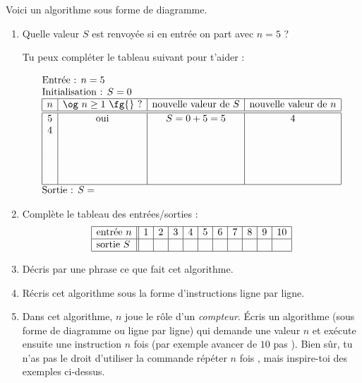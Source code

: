 \documentclass[class=report,crop=false, 12pt]{standalone}
\begin{document}
\begin{activite}
Voici un algorithme sous forme de diagramme.
  

  
\begin{enumerate}
    \item Quelle valeur $S$ est renvoyée si en entrée on part avec $n = 5$ ?
      
    Tu peux compléter le tableau suivant pour t'aider :
     
  $$
  \begin{array}{l}
  \text{Entrée : $n=5$}    \\
  \text{Initialisation : $S=0$}    \\  
  \begin{array}{|c|c|c|c|}
  \hline  
   n & \text{\og $n \ge 1$ \fg{} ?} & \text{nouvelle valeur de } S &  \text{nouvelle valeur de } n\\
  \hline\hline 
   5 & \text{oui} & S = 0+5 = 5 & 4 \\
   4 &  &  & \\
     &  &  & \\   
     &  &  & \\
     &  &  & \\      
     &  &  & \\
  \hline
  \end{array} \\
  \text{Sortie : $S = $}  
  \end{array} 
  $$ 
    
    \item Complète le tableau des entrées/sorties  : 
        $$\begin{array}{|l||c|c|c|c|c|c|c|c|c|c|}
  \hline
  \text{entrée } n & 1&2&3&4&5&6&7&8&9&10 \\
  \hline
  \text{sortie } S & &&&&&&&&& \\
  \hline
  \end{array}  
  $$ 
    \item Décris par une phrase ce que fait cet algorithme.
        
    \item Récris cet algorithme sous la forme d'instructions \og{}ligne par ligne\fg{}.
    
    \item Dans cet algorithme, $n$ joue le rôle d'un \emph{compteur}. 
    Écris un algorithme (sous forme de diagramme ou \og{}ligne par ligne\fg{}) qui demande une valeur $n$ et exécute ensuite une instruction $n$ fois (par exemple \og avancer de $10$ pas \fg{}). Bien sûr, tu n'as pas le droit d'utiliser la commande \og répéter $n$ fois \fg{}, mais inspire-toi des exemples ci-dessus.
\end{enumerate}
\end{activite}
\end{document}
